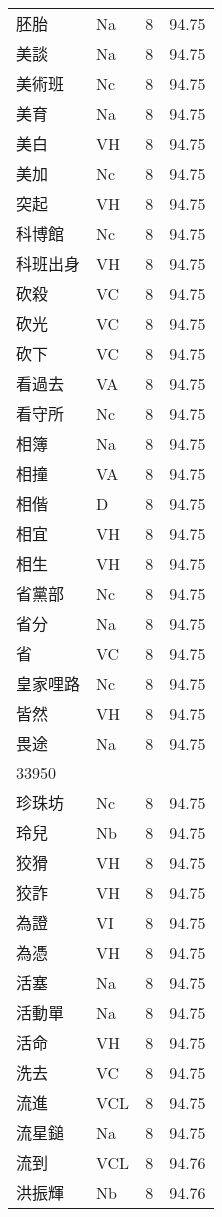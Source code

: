 \documentclass[twocolumn]{book}
\begin{document}
\begin{supertabular}{llrr}
胚胎 & Na & 8 &  94.75\\
美談 & Na & 8 &  94.75\\
美術班 & Nc & 8 &  94.75\\
美育 & Na & 8 &  94.75\\
美白 & VH & 8 &  94.75\\
美加 & Nc & 8 &  94.75\\
突起 & VH & 8 &  94.75\\
科博館 & Nc & 8 &  94.75\\
科班出身 & VH & 8 &  94.75\\
砍殺 & VC & 8 &  94.75\\
砍光 & VC & 8 &  94.75\\
砍下 & VC & 8 &  94.75\\
看過去 & VA & 8 &  94.75\\
看守所 & Nc & 8 &  94.75\\
相簿 & Na & 8 &  94.75\\
相撞 & VA & 8 &  94.75\\
相偕 & D & 8 &  94.75\\
相宜 & VH & 8 &  94.75\\
相生 & VH & 8 &  94.75\\
省黨部 & Nc & 8 &  94.75\\
省分 & Na & 8 &  94.75\\
省 & VC & 8 &  94.75\\
皇家哩路 & Nc & 8 &  94.75\\
皆然 & VH & 8 &  94.75\\
畏途 & Na & 8 &  94.75\\
33950\\
珍珠坊 & Nc & 8 &  94.75\\
玲兒 & Nb & 8 &  94.75\\
狡猾 & VH & 8 &  94.75\\
狡詐 & VH & 8 &  94.75\\
為證 & VI & 8 &  94.75\\
為憑 & VH & 8 &  94.75\\
活塞 & Na & 8 &  94.75\\
活動單 & Na & 8 &  94.75\\
活命 & VH & 8 &  94.75\\
洗去 & VC & 8 &  94.75\\
流進 & VCL & 8 &  94.75\\
流星鎚 & Na & 8 &  94.75\\
流到 & VCL & 8 &  94.76\\
洪振輝 & Nb & 8 &  94.76\\

\end{supertabular}
\end{document}
